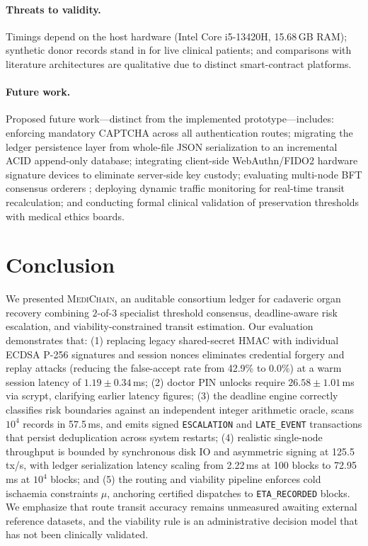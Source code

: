 \documentclass[journal]{IEEEtran}
\newcommand{\mc}{\textsc{MediChain}}
\begin{document}
\paragraph*{Threats to validity.}
Timings depend on the host hardware (Intel Core i5-13420H, 15.68\,GB RAM); synthetic donor
records stand in for live clinical patients; and comparisons with literature architectures
are qualitative due to distinct smart-contract platforms.

\paragraph*{Future work.}
Proposed future work—distinct from the implemented prototype—includes: enforcing mandatory
CAPTCHA across all authentication routes; migrating the ledger persistence layer from whole-file
JSON serialization to an incremental ACID append-only database; integrating client-side WebAuthn/FIDO2
hardware signature devices to eliminate server-side key custody; evaluating multi-node BFT
consensus orderers \cite{pbft1999}; deploying dynamic traffic monitoring for real-time transit
recalculation; and conducting formal clinical validation of preservation thresholds with medical
ethics boards.

\section{Conclusion}\label{sec:conclusion}
We presented \mc, an auditable consortium ledger for cadaveric organ recovery
combining $2$-of-$3$ specialist threshold consensus, deadline-aware risk escalation,
and viability-constrained transit estimation. Our evaluation demonstrates that:
(1) replacing legacy shared-secret HMAC with individual ECDSA P-256 signatures
and session nonces eliminates credential forgery and replay attacks (reducing
the false-accept rate from 42.9\% to 0.0\%) at a warm session latency of $1.19\pm0.34$\,ms;
(2) doctor PIN unlocks require $26.58\pm1.01$\,ms via scrypt, clarifying earlier
latency figures; (3) the deadline engine correctly classifies risk boundaries
against an independent integer arithmetic oracle, scans $10^4$ records in 57.5\,ms,
and emits signed \texttt{ESCALATION} and \texttt{LATE\_EVENT} transactions that
persist deduplication across system restarts; (4) realistic single-node throughput
is bounded by synchronous disk IO and asymmetric signing at 125.5\,tx/s, with
ledger serialization latency scaling from 2.22\,ms at 100 blocks to 72.95\,ms at
$10^4$ blocks; and (5) the routing and viability pipeline enforces cold ischaemia
constraints $\mu$, anchoring certified dispatches to \texttt{ETA\_RECORDED} blocks.
We emphasize that route transit accuracy remains unmeasured awaiting external
reference datasets, and the viability rule is an administrative decision model
that has not been clinically validated.
\end{document}
